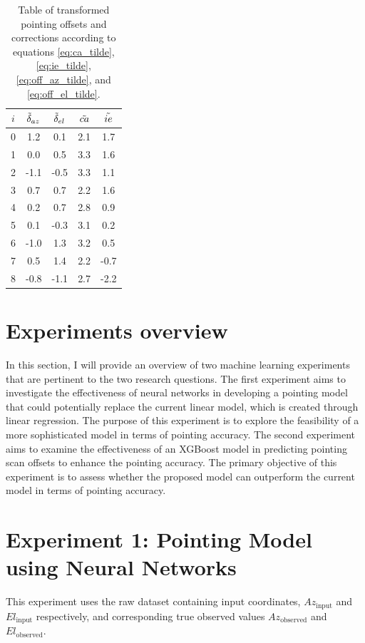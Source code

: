 \begin{table}[H]
    \centering
    \caption{Table of transformed pointing offsets and corrections according to equations \eqref{eq:ca_tilde}, \eqref{eq:ie_tilde}, \eqref{eq:off_az_tilde}, and \eqref{eq:off_el_tilde}.}
    \label{tab:tranform_offsets}
\begin{tabular}{ccccc}
\toprule
$i$ & $\Tilde{\delta}_{az}$ &  $\Tilde{\delta}_{el}$ &  $\Tilde{ca}$ &  $\Tilde{ie}$ \\
\midrule
0 &       1.2 &       0.1 &       2.1 &       1.7 \\
1 &       0.0 &       0.5 &       3.3 &       1.6 \\
2 &      -1.1 &      -0.5 &       3.3 &       1.1 \\
3 &       0.7 &       0.7 &       2.2 &       1.6 \\
4 &       0.2 &       0.7 &       2.8 &       0.9 \\
5 &       0.1 &      -0.3 &       3.1 &       0.2 \\
6 &      -1.0 &       1.3 &       3.2 &       0.5 \\
7 &       0.5 &       1.4 &       2.2 &      -0.7 \\
8 &      -0.8 &      -1.1 &       2.7 &      -2.2 \\
\bottomrule
\end{tabular}
\end{table}


\section{Experiments overview}
In this section, I will provide an overview of two machine learning experiments that are pertinent to the two research questions.
The first experiment aims to investigate the effectiveness of neural networks in developing a pointing model that could potentially replace the current linear model, which is created through linear regression.
The purpose of this experiment is to explore the feasibility of a more sophisticated model in terms of pointing accuracy.
The second experiment aims to examine the effectiveness of an XGBoost model in predicting pointing scan offsets to enhance the pointing accuracy.
The primary objective of this experiment is to assess whether the proposed model can outperform the current model in terms of pointing accuracy.

\section{Experiment 1: Pointing Model using Neural Networks}
This experiment uses the raw dataset containing input coordinates, $Az_{\text{input}}$ and $El_{\text{input}}$ respectively, and corresponding true observed values $Az_{\text{observed}}$ and $El_{\text{observed}}$.


